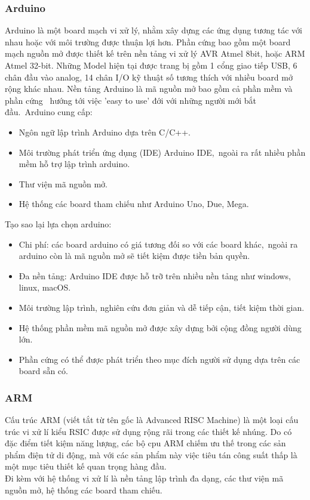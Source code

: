\documentclass[a4paper,12pt,oneside]{article}
\begin{document}
\subsubsection{Arduino}
\noindent Arduino là một board mạch vi xử lý, nhằm xây dựng các ứng dụng tương tác với nhau hoặc với môi trường được thuận lợi hơn. Phần cứng bao gồm một board mạch nguồn mở được thiết kế trên nền tảng vi xử lý AVR Atmel 8bit, hoặc ARM Atmel 32-bit. Những Model hiện tại được trang bị gồm 1 cổng giao tiếp USB, 6 chân đầu vào analog, 14 chân I/O kỹ thuật số tương thích với nhiều board mở rộng khác nhau. Nền tảng Arduino là mã nguồn mở bao gồm cả phần mềm và phần cứng \
hướng tới việc 'easy to use' đới với những người mới bắt đầu.\
Arduino cung cấp:
\begin{itemize}
\item Ngôn ngữ lập trình Arduino dựa trên C/C++.
\item Môi trường phát triển ứng dụng (IDE) Arduino IDE,\
ngoài ra rất nhiều phần mềm hỗ trợ lập trình arduino.
\item Thư viện mã nguồn mở.
\item Hệ thống các board tham chiếu như Arduino Uno, Due, Mega.
\end{itemize}
Tạo sao lại lựa chọn arduino:
\begin{itemize}
\item Chi phí: các board arduino có giá tương đối so với các board khác,\
ngoài ra arduino còn là mã nguồn mở sẽ tiết kiệm được tiền bản quyền.
\item Đa nền tảng: Arduino IDE được hỗ trỡ trên nhiều nền tảng như windows, linux, macOS.
\item Môi trường lập trình, nghiên cứu đơn giản và dễ tiếp cận, tiết kiệm thời gian.
\item Hệ thống phần mềm mã nguồn mở được xây dựng bởi cộng đồng người dùng lớn.
\item Phần cứng có thể được phát triển theo mục đích người sử dụng dựa trên các board sẵn có.
\end{itemize}

\subsubsection{ARM}
\noindent Cấu trúc ARM (viết tắt từ tên gốc là Advanced RISC Machine) là một loại cấu trúc vi xử lí kiểu RSIC được sử dụng rộng rãi trong các thiết kế nhúng. Do có đặc điểm tiết kiệm năng lượng, các bộ cpu ARM chiếm ưu thế trong các sản phẩm điện tử di động, mà với các sản phẩm này việc tiêu tán công suất thấp là một mục tiêu thiết kế quan trọng hàng đầu.\\
\noindent Đi kèm với hệ thống vi xử lí là nền tảng lập trình đa dạng, các thư viện mã nguồn mở, hệ thống các board tham chiếu.
\end{document}
